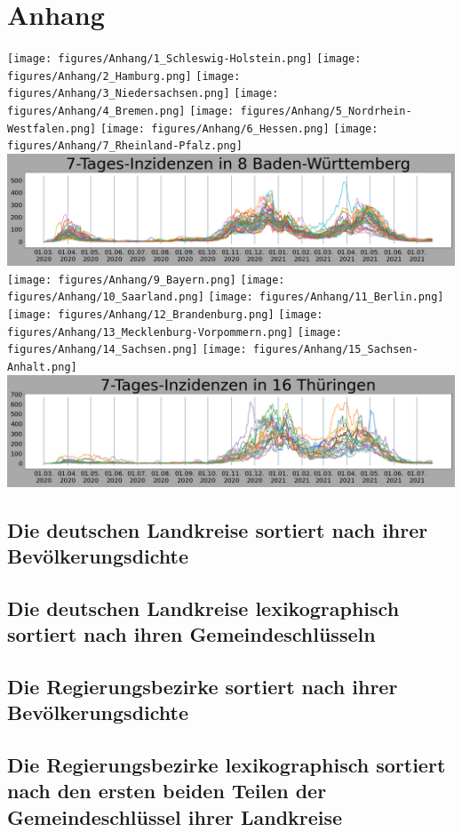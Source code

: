 \chapter{Anhang}\label{Anhang}
\texttt{[image: figures/Anhang/1\_Schleswig-Holstein.png]}
\texttt{[image: figures/Anhang/2\_Hamburg.png]}
\texttt{[image: figures/Anhang/3\_Niedersachsen.png]}
\texttt{[image: figures/Anhang/4\_Bremen.png]}
\texttt{[image: figures/Anhang/5\_Nordrhein-Westfalen.png]}
\texttt{[image: figures/Anhang/6\_Hessen.png]}
\texttt{[image: figures/Anhang/7\_Rheinland-Pfalz.png]}
\includegraphics[width=\textwidth]{figures/Anhang/8_Baden-Württemberg.png}
\texttt{[image: figures/Anhang/9\_Bayern.png]}
\texttt{[image: figures/Anhang/10\_Saarland.png]}
\texttt{[image: figures/Anhang/11\_Berlin.png]}
\texttt{[image: figures/Anhang/12\_Brandenburg.png]}
\texttt{[image: figures/Anhang/13\_Mecklenburg-Vorpommern.png]}
\texttt{[image: figures/Anhang/14\_Sachsen.png]}
\texttt{[image: figures/Anhang/15\_Sachsen-Anhalt.png]}
\includegraphics[width=\textwidth]{figures/Anhang/16_Thüringen.png}
\newpage
\section{Die deutschen Landkreise sortiert nach ihrer Bevölkerungsdichte}
\label{tab:counties_by_pop_density}

\section{Die deutschen Landkreise lexikographisch sortiert nach ihren Gemeindeschlüsseln}
\label{tab:counties_by_admunitid}

\section{Die Regierungsbezirke sortiert nach ihrer Bevölkerungsdichte}
\label{tab:districts_by_pop_density}

\section{Die Regierungsbezirke lexikographisch sortiert nach den ersten beiden Teilen der Gemeindeschlüssel ihrer Landkreise}
\label{tab:districts_by_admunitid}

\newpage
